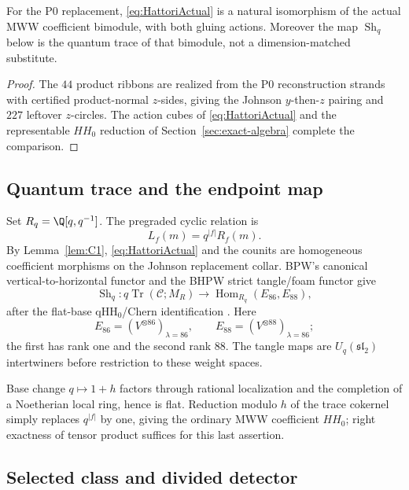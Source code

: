 \begin{lemma}\label{lem:C1}
For the P0 replacement, \eqref{eq:HattoriActual} is a natural isomorphism of
the actual MWW coefficient bimodule, with both gluing actions.  Moreover the
map \(\operatorname{Sh}_q\) below is the quantum trace of that bimodule, not a
dimension-matched substitute.
\end{lemma}

\begin{proof}
The $44$ product ribbons are realized from the P0 reconstruction strands with
certified product-normal $z$-sides, giving the Johnson $y$-then-$z$ pairing
and $227$ leftover $z$-circles.  The action cubes of \eqref{eq:HattoriActual}
and the representable $HH_0$ reduction of Section~\ref{sec:exact-algebra}
complete the comparison.
\end{proof}

\subsection{Quantum trace and the endpoint map}

Set $R_q=\Q[q,q^{-1}]$.  The pregraded cyclic relation is
\[
L_f(m)=q^{|f|}R_f(m).
\]
By Lemma~\ref{lem:C1}, \eqref{eq:HattoriActual} and the counits are homogeneous
coefficient morphisms on the Johnson replacement collar.  BPW's canonical vertical-to-horizontal functor and the BHPW strict
tangle/foam functor give
\begin{equation}\label{eq:actualShadow}
\operatorname{Sh}_q:q\operatorname{Tr}(\mathcal C;M_R)
\longrightarrow\operatorname{Hom}_{R_q}(E_{86},E_{88}),
\end{equation}
after the flat-base qHH$_0$/Chern identification
\cite{BeliakovaPutyraWehrli2019,BeliakovaHogancampPutyraWehrli2023}.  Here
\[
E_{86}=(V^{\otimes86})_{\lambda=86},\qquad
E_{88}=(V^{\otimes88})_{\lambda=86};
\]
the first has rank one and the second rank 88.  The tangle maps are
$U_q(\mathfrak{sl}_2)$ intertwiners before restriction to these weight
spaces.

Base change $q\mapsto1+h$ factors through rational localization and the
completion of a Noetherian local ring, hence is flat.  Reduction modulo $h$
of the trace cokernel simply replaces $q^{|f|}$ by one, giving the ordinary
MWW coefficient $HH_0$; right exactness of tensor product suffices for this
last assertion.

\subsection{Selected class and divided detector}

